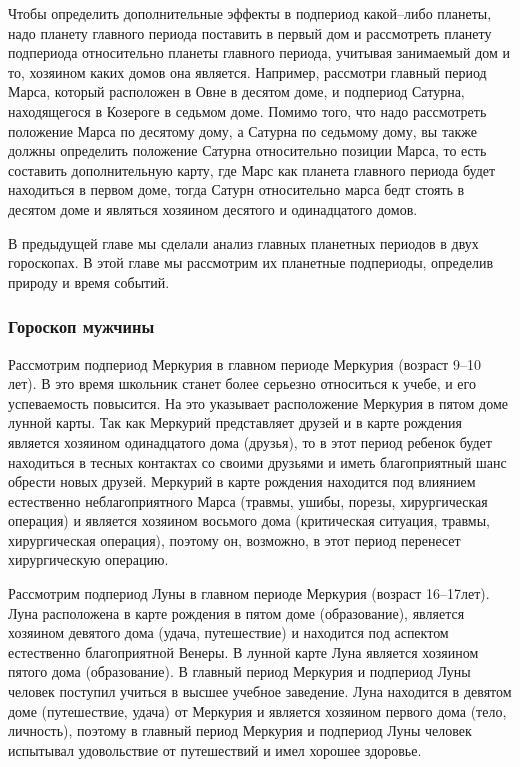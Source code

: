 Чтобы определить дополнительные эффекты в подпериод какой--либо планеты, надо планету главного периода поставить в первый дом и рассмотреть планету подпериода относительно планеты главного периода, учитывая занимаемый дом и то, хозяином каких домов она является. Например, рассмотри главный период Марса, который расположен в Овне в десятом доме, и подпериод Сатурна, находящегося в Козероге в седьмом доме. Помимо того, что надо рассмотреть положение Марса по десятому дому, а Сатурна по седьмому дому, вы также должны определить положение Сатурна относительно позиции Марса, то есть составить дополнительную карту, где Марс как планета главного периода будет находиться в первом доме, тогда Сатурн относительно марса бедт стоять в десятом доме и являться хозяином десятого и одинадцатого домов.

В предыдущей главе мы сделали анализ главных планетных периодов в двух гороскопах. В этой главе мы рассмотрим их планетные подпериоды, определив природу и время событий. 

\subsubsection*{Гороскоп мужчины}

\natal[%
	asc=8,
	two=МАРС\\РАХУ,
	five=ЛУНА,
	eight=КЕТУ\\ЮПИТЕР,
	nine=МЕРКУРИЙ,
	ten=СОЛНЦЕ,
	eleven=ВЕНЕРА,
	twelve=САТУРН
]{}

Рассмотрим подпериод Меркурия в главном периоде Меркурия (возраст 9--10 лет). В это время школьник станет более серьезно относиться к учебе, и его успеваемость повысится. На это указывает расположение Меркурия в пятом доме лунной карты. Так как Меркурий представляет друзей и в карте рождения является хозяином одинадцатого дома (друзья), то в этот период ребенок будет находиться в тесных контактах со своими друзьями и иметь благоприятный шанс обрести новых друзей. Меркурий в карте рождения находится под влиянием естественно неблагоприятного Марса (травмы, ушибы, порезы, хирургическая операция) и является хозяином восьмого дома (критическая ситуация, травмы, хирургическая операция), поэтому он, возможно, в этот период перенесет хирургическую операцию.

Рассмотрим подпериод Луны в главном периоде Меркурия (возраст 16--17лет). Луна расположена в карте рождения в пятом доме (образование), является хозяином девятого дома (удача, путешествие) и находится под аспектом естественно благоприятной Венеры. В лунной карте Луна является хозяином пятого дома (образование). В главный период Меркурия и подпериод Луны человек поступил учиться в высшее учебное заведение. Луна находится в девятом доме (путешествие, удача) от Меркурия и является хозяином первого дома (тело, личность), поэтому в главный период Меркурия и подпериод Луны человек испытывал удовольствие от путешествий и имел хорошее здоровье.

